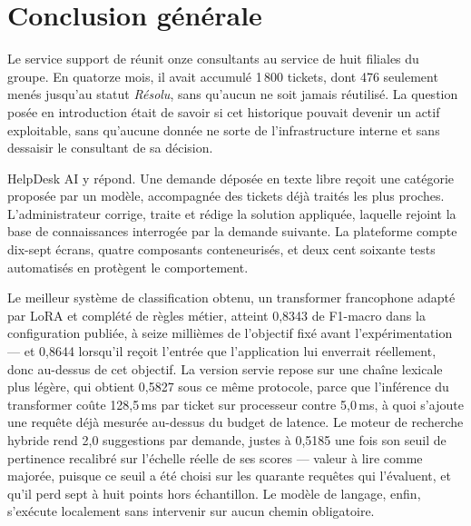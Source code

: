 \chapter*{Conclusion générale}

Le service support de \otbs réunit onze consultants au service de huit filiales du groupe. En
quatorze mois, il avait accumulé 1\,800 tickets, dont 476 seulement menés jusqu'au statut
\emph{Résolu}, sans qu'aucun ne soit jamais réutilisé. La question posée en introduction était de
savoir si cet historique pouvait devenir un actif exploitable, sans
qu'aucune donnée ne sorte de l'infrastructure interne et sans dessaisir le consultant de sa
décision.

HelpDesk AI y répond. Une demande déposée en texte libre reçoit une catégorie proposée par un
modèle, accompagnée des tickets déjà traités les plus proches. L'administrateur corrige, traite et
rédige la solution appliquée, laquelle rejoint la base de connaissances interrogée par la demande
suivante. La plateforme compte dix-sept écrans, quatre composants conteneurisés, et deux cent
soixante tests automatisés en protègent le comportement.

Le meilleur système de classification obtenu, un transformer francophone adapté par LoRA et complété
de règles métier, atteint 0,8343 de F1-macro dans la configuration publiée, à seize millièmes de
l'objectif fixé avant l'expérimentation — et 0,8644 lorsqu'il reçoit l'entrée que l'application lui
enverrait réellement, donc au-dessus de cet objectif. La version servie repose sur une chaîne
lexicale plus légère, qui obtient 0,5827 sous ce même protocole, parce que l'inférence du
transformer coûte 128,5\,ms par ticket sur processeur contre 5,0\,ms, à quoi s'ajoute une requête
déjà mesurée au-dessus du budget de latence. Le moteur de recherche hybride rend 2,0 suggestions par
demande, justes à 0,5185 une fois son seuil de pertinence recalibré sur l'échelle réelle de ses
scores — valeur à lire comme majorée, puisque ce seuil a été choisi sur les quarante requêtes qui
l'évaluent, et qu'il perd sept à huit points hors échantillon. Le modèle de langage, enfin,
s'exécute localement sans intervenir sur aucun chemin obligatoire.

